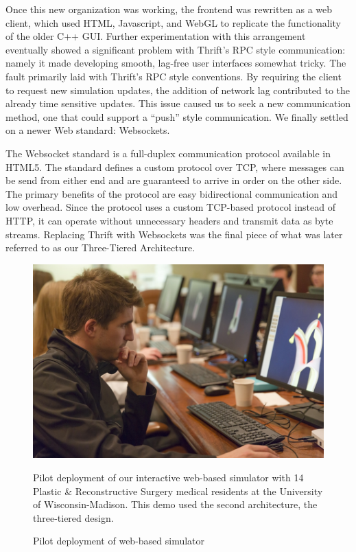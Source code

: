  Once this new organization was working, the frontend was rewritten as
 a web client, which used HTML, Javascript, and WebGL to replicate the
 functionality of the older C++ GUI. Further experimentation with this
 arrangement eventually showed a significant problem with Thrift's RPC
 style communication: namely it made developing smooth, lag-free user
 interfaces somewhat tricky. The fault primarily laid with Thrift's
 RPC style conventions. By requiring the client to request new
 simulation updates, the addition of network lag contributed to the
 already time sensitive updates. This issue caused us to seek a new
 communication method, one that could support a ``push'' style
 communication. We finally settled on a newer Web standard:
 Websockets.

 The Websocket standard is a full-duplex communication protocol
 available in HTML5. The standard defines a custom protocol over TCP, where
 messages can be send from either end and are guaranteed to
 arrive in order on the other side. The primary benefits of the
 protocol are easy bidirectional communication and low overhead. Since
 the protocol uses a custom TCP-based protocol instead of HTTP, it can
 operate without unnecessary headers and transmit data as byte streams.
 Replacing Thrift with Websockets was the final piece of what was
 later referred to as our Three-Tiered Architecture.


\begin{figure}[t]
\includegraphics[width=\columnwidth]{chapter_gridiron/images/CS_SurgerySim.jpg}
\vspace*{-.18in}
\caption{Pilot deployment of web-based simulator}{Pilot deployment of
  our interactive web-based simulator with 14 Plastic \&
  Reconstructive Surgery medical residents at the University of
  Wisconsin-Madison. This demo used the second architecture, the
  three-tiered design.}
\vspace*{-.18in}
\label{fig:pilot}
\end{figure}
 
